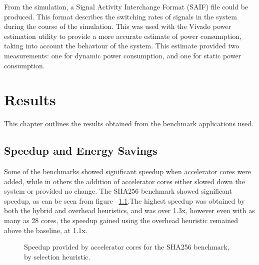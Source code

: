 \documentclass{UoYCSproject}
\begin{document}
From the simulation, a Signal Activity Interchange Format (SAIF) file could be produced. This format describes the
switching rates of signals in the system during the course of the simulation. This was used with the Vivado
power estimation utility to provide a more accurate estimate of power consumption, taking into account the behaviour
of the system. This estimate provided two measurements: one for dynamic power consumption, and one for static power consumption.

\chapter{Results}

This chapter outlines the results obtained from the benchmark applications used.

\section{Speedup and Energy Savings}

Some of the benchmarks showed significant speedup when accelerator cores were added, while in others the addition of
accelerator cores either slowed down the system or provided no change. The SHA256 benchmark showed significant speedup,
as can be seen from figure ~\ref{fig:speedupSHA256}.The highest speedup was obtained by both the hybrid and overhead heuristics,
and was over 1.3x, however even with as many as 28 cores, the speedup gained using the overhead heuristic remained above the
baseline, at 1.1x.

\begin{figure}[H]
\caption{Speedup provided by accelerator cores for the SHA256 benchmark, by selection heuristic.}
\label{fig:speedupSHA256}
\end{figure}
\end{document}
